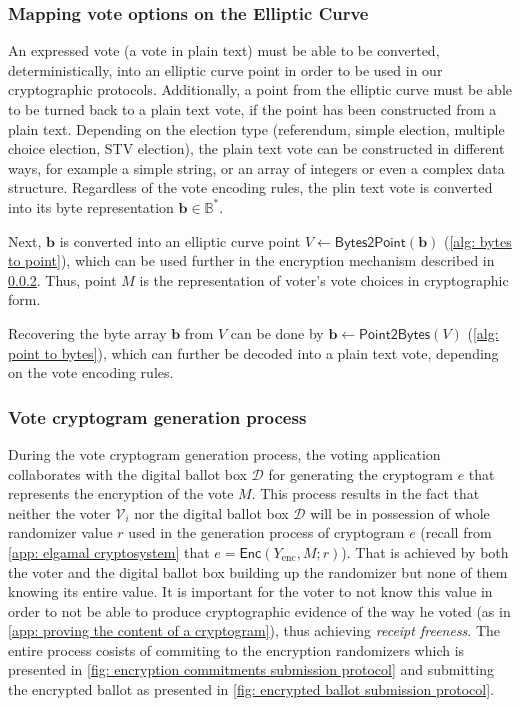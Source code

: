 \subsubsection{Mapping vote options on the Elliptic Curve} \label{sec: mapping vote options on the elliptic curve}
An expressed vote (a vote in plain text) must be able to be converted, deterministically, into an elliptic curve point in order to be used in our cryptographic protocols. Additionally, a point from the elliptic curve must be able to be turned back to a plain text vote, if the point has been constructed from a plain text. Depending on the election type (referendum, simple election, multiple choice election, STV election), the plain text vote can be constructed in different ways, for example a simple string, or an array of integers or even a complex data structure. Regardless of the vote encoding rules, the plin text vote is converted into its byte representation $\boldsymbol{b} \in \mathbb{B}^*$.

Next, $\boldsymbol{b}$ is converted into an elliptic curve point $V \gets \mathsf{Bytes2Point}(\boldsymbol{b})$ (\cref{alg: bytes to point}), which can be used further in the encryption mechanism described in \cref{sec: vote cryptogram generation process}. Thus, point $M$ is the representation of voter's vote choices in cryptographic form.

Recovering the byte array $\boldsymbol{b}$ from $V$ can be done by $\boldsymbol{b} \gets \mathsf{Point2Bytes}(V)$ (\cref{alg: point to bytes}), which can further be decoded into a plain text vote, depending on the vote encoding rules.


\subsubsection{Vote cryptogram generation process} \label{sec: vote cryptogram generation process}
During the vote cryptogram generation process, the voting application collaborates with the digital ballot box $\mathcal{D}$ for generating the cryptogram $e$ that represents the encryption of the vote $M$. This process results in the fact that neither the voter $\mathcal{V}_i$ nor the digital ballot box $\mathcal{D}$ will be in possession of whole randomizer value $r$ used in the generation process of cryptogram $e$ (recall from \cref{app: elgamal cryptosystem} that $e = \mathsf{Enc}(Y_\mathrm{enc}, M; r)$). That is achieved by both the voter and the digital ballot box building up the randomizer but none of them knowing its entire value. It is important for the voter to not know this value in order to not be able to produce cryptographic evidence of the way he voted (as in \cref{app: proving the content of a cryptogram}), thus achieving \textit{receipt freeness}. The entire process cosists of commiting to the encryption randomizers which is presented in \cref{fig: encryption commitments submission protocol} and submitting the encrypted ballot as presented in \cref{fig: encrypted ballot submission protocol}.

